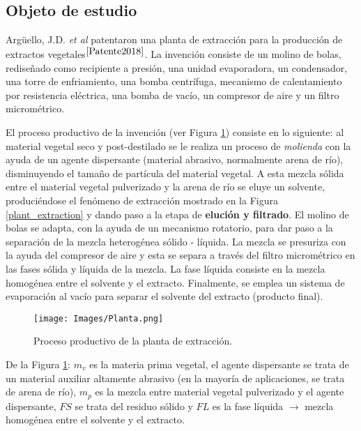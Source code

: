 \subsection{Objeto de estudio}

\noindent
\justify

Arg\"uello, J.D. \textit{et al} patentaron una planta de extracci\'on para la producci\'on de extractos vegetales$^{\cite{Patente2018}}$. La invenci\'on consiste de un molino de bolas, redise\~nado como recipiente a presi\'on, una unidad evaporadora, un condensador, una torre de enfriamiento, una bomba centr\'ifuga, mecanismo de calentamiento por resistencia el\'ectrica, una bomba de vac\'io, un compresor de aire y un filtro microm\'etrico.

\noindent
\justify

El proceso productivo de la invenci\'on (ver Figura \ref{planta}) consiste en lo siguiente: al material vegetal seco y post-destilado se le realiza un proceso de \textit{molienda} con la ayuda de un agente dispersante (material abrasivo, normalmente arena de r\'io), disminuyendo el tama\~no de part\'icula del material vegetal. A esta mezcla s\'olida entre el material vegetal pulverizado y la arena de r\'io se eluye un solvente, produci\'endose el fen\'omeno de extracci\'on mostrado en la Figura \ref{plant_extraction} y dando paso a la etapa de \textbf{eluci\'on y filtrado}. El molino de bolas se adapta, con la ayuda de un mecanismo rotatorio, para dar paso a la separaci\'on de la mezcla heterog\'enea s\'olido - l\'iquida. La mezcla se presuriza con la ayuda del compresor de aire y esta se separa a trav\'es del filtro microm\'etrico en las fases s\'olida y l\'iquida de la mezcla. La fase l\'iquida consiste en la mezcla homog\'enea entre el solvente y el extracto. Finalmente, se emplea un sistema de evaporaci\'on al vac\'io para separar el solvente del extracto (producto final). 

\begin{figure}[h!]
	\centering
	\texttt{[image: Images/Planta.png]}
	\caption{Proceso productivo de la planta de extracci\'on.}
	\label{planta}
\end{figure}

\noindent
\justify

De la Figura \ref{planta}: $m_v$ es la materia prima vegetal, el agente dispersante se trata de un material auxiliar altamente abrasivo (en la mayor\'ia de aplicaciones, se trata de arena de r\'io), $m_p$ es la mezcla entre material vegetal pulverizado y el agente dispersante, $FS$ se trata del residuo s\'olido y $FL$ es la fase l\'iquida $\rightarrow$ mezcla homog\'enea entre el solvente y el extracto.

